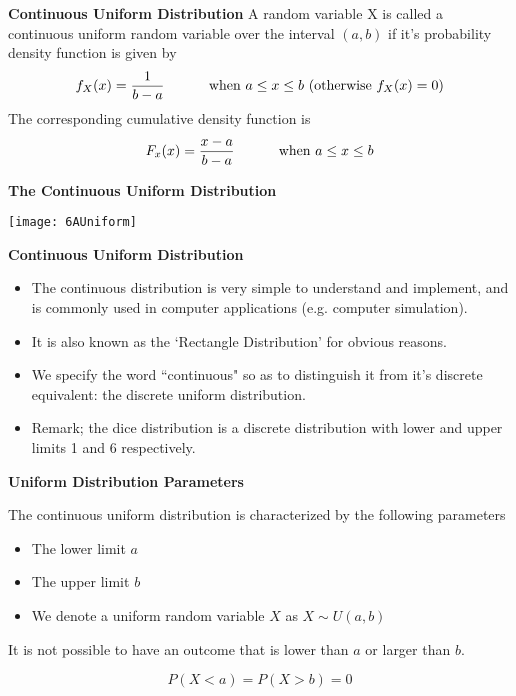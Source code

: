 



{
\textbf{Continuous Uniform Distribution}
A random variable X is called a continuous uniform random variable over the interval $(a,b)$ if it's probability density function is given by
\[ f_{X}(x) = { 1 \over b-a} \hspace{1cm} \mbox{ when } a \leq x \leq b \mbox{     (otherwise } f_X(x) = 0 ) \]
The corresponding cumulative density function is
\[ F_x(x) = { x-a \over b-a} \hspace{1cm} \mbox{ when } a \leq x \leq b\]
}

\textbf{The Continuous Uniform Distribution}



\begin{center}
\texttt{[image: 6AUniform]}

\end{center}
\medskip
{
\textbf{Continuous Uniform Distribution}
\begin{itemize}
\item The continuous distribution is very simple to understand and implement, and is commonly used in computer applications (e.g. computer simulation).
\item It is also known as the `Rectangle Distribution' for obvious reasons.
\item We specify the word ``continuous" so as to distinguish it from it's discrete equivalent: the discrete uniform distribution.
\item Remark; the dice distribution is a discrete distribution with lower and upper limits 1 and 6 respectively.
\end{itemize}
}
{
\textbf{Uniform Distribution Parameters}


The continuous uniform distribution is characterized by the following parameters

\begin{itemize}
\item The lower limit $a$
\item The upper limit $b$
\item We denote a uniform random variable $X$ as $X \sim U(a,b)$
\end{itemize}

It is not possible to have an outcome that is lower than $a$ or larger than $b$.

\[ P(X < a) = P(X > b) = 0\]
}

